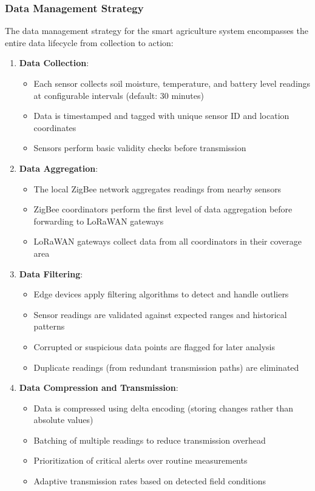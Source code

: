 \documentclass[12pt,a4paper]{article}
\begin{document}
\subsubsection{Data Management Strategy}

The data management strategy for the smart agriculture system encompasses the entire data lifecycle from collection to action:

\begin{enumerate}
    \item \textbf{Data Collection}:
    \begin{itemize}
        \item Each sensor collects soil moisture, temperature, and battery level readings at configurable intervals (default: 30 minutes)
        \item Data is timestamped and tagged with unique sensor ID and location coordinates
        \item Sensors perform basic validity checks before transmission
    \end{itemize}
    
    \item \textbf{Data Aggregation}:
    \begin{itemize}
        \item The local ZigBee network aggregates readings from nearby sensors
        \item ZigBee coordinators perform the first level of data aggregation before forwarding to LoRaWAN gateways
        \item LoRaWAN gateways collect data from all coordinators in their coverage area
    \end{itemize}
    
    \item \textbf{Data Filtering}:
    \begin{itemize}
        \item Edge devices apply filtering algorithms to detect and handle outliers
        \item Sensor readings are validated against expected ranges and historical patterns
        \item Corrupted or suspicious data points are flagged for later analysis
        \item Duplicate readings (from redundant transmission paths) are eliminated
    \end{itemize}
    
    \item \textbf{Data Compression and Transmission}:
    \begin{itemize}
        \item Data is compressed using delta encoding (storing changes rather than absolute values)
        \item Batching of multiple readings to reduce transmission overhead
        \item Prioritization of critical alerts over routine measurements
        \item Adaptive transmission rates based on detected field conditions
    \end{itemize}
    

\end{enumerate}
\end{document}
